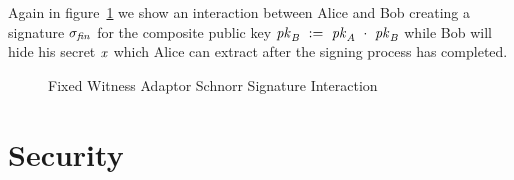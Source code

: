 Again in figure~\ref{fig:aptSchnorrInteraction} we show an interaction between Alice and Bob creating a signature $\sigma_{\mathit{fin}}$ for the composite public key $\mathit{pk}_{\mathit{B}} ~:=~ \mathit{pk}_{\mathit{A}} ~\cdot~ \mathit{pk}_{\mathit{B}}$
while Bob will hide his secret $\mathit{x}$ which Alice can extract after the signing process has completed.

\begin{figure}
    \caption{Fixed Witness Adaptor Schnorr Signature Interaction}
    \label{fig:aptSchnorrInteraction}
\end{figure}

\section{Security}\label{sec:twopartyAptSecurity}

